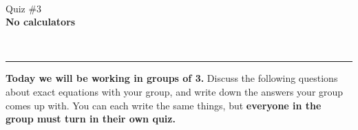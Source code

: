 \documentclass[12pt]{article}
\newcommand{\version}{}
\newcommand{\xzero}{}
\newcommand{\xone}{}
\newcommand{\xtwo}{}
\newcommand{\xthree}{}
\newcommand{\xfour}{}
\newcommand{\xfive}{}
\newcommand{\ExamName}{Quiz \#3\version}
\begin{document}
\renewcommand{\version}{}
\renewcommand{\xzero}{0.0}
\renewcommand{\xone}{1.3}
\renewcommand{\xtwo}{2.9}
\renewcommand{\xthree}{4.1}
\renewcommand{\xfour}{5.3}
\renewcommand{\xfive}{6.5}
% 
\begin{minipage}{0.25\linewidth}
  \CourseName\ \Quarter \\
  \ExamName \\[1em]
  \textbf{No calculators}\\[2em]
\end{minipage}
\hfill
\begin{minipage}[t]{0.4\linewidth}
\end{minipage}
\hfill
\begin{minipage}{0.25\linewidth}
  \vspace*{-3.25em}
  \ \hfill
\end{minipage}
\vspace*{-0.25in}

\hfill
\begin{minipage}{0.5\linewidth}

\end{minipage}
\noindent\hspace*{-2em}\rule{\textwidth+4em}{1pt}%

\mbox{}

\textbf{Today we will be working in groups of 3.} Discuss the following questions about exact equations with your group, and write down the answers your group comes up with. You can each write the same things, but \textbf{everyone in the group must turn in their own quiz.}
\end{document}
